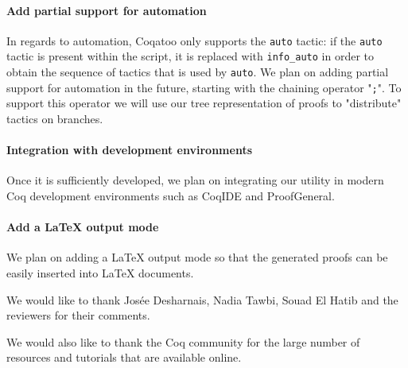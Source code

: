 \documentclass[sigplan,screen,9pt]{acmart}
\begin{document}
\paragraph{Add partial support for automation}
In regards to automation, Coqatoo only supports the \lstinline{auto} tactic: if the \lstinline{auto} tactic is present within the script, it is replaced with \lstinline{info_auto} in order to obtain the sequence of tactics that is used by \lstinline{auto}. We plan on adding partial support for automation in the future, starting with the chaining operator "\lstinline{;}". To support this operator we will use our tree representation of proofs to "distribute" tactics on branches.

\paragraph{Integration with development environments} Once it is sufficiently developed, we plan on integrating our utility in modern Coq development environments such as CoqIDE and ProofGeneral.

\paragraph{Add a LaTeX output mode} 
We plan on adding a LaTeX output mode so that the generated proofs can be easily inserted into LaTeX documents.

\begin{acks}
  We would like to thank Josée Desharnais, Nadia Tawbi, Souad El Hatib and the reviewers for their comments.

  We would also like to thank the Coq community for the large number of resources and tutorials that are available online.
\end{acks}


\end{document}
